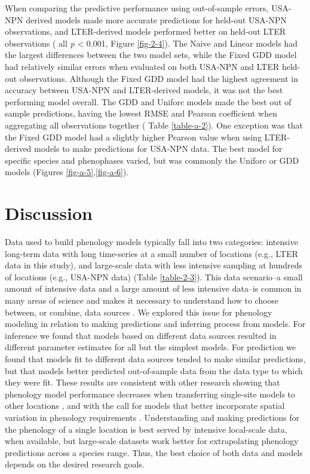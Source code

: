 When comparing the predictive performance using out-of-sample errors, USA-NPN derived models made more accurate predictions for held-out USA-NPN observations, and LTER-derived models performed better on held-out LTER observations ( all \textit{p} < 0.001, Figure \ref{fig-2-4}). The Naive and Linear models had the largest differences between the two model sets, while the Fixed GDD model had relatively similar errors when evaluated on both USA-NPN and LTER held-out observations. Although the Fixed GDD model had the highest agreement in accuracy between USA-NPN and LTER-derived models, it was not the best performing model overall. The GDD and Uniforc models made the best out of sample predictions, having the lowest RMSE and Pearson coefficient when aggregating all observations together ( Table \ref{table-a-2}). One exception was that the Fixed GDD model had a slightly higher Pearson value when using LTER-derived models to make predictions for USA-NPN data. The best model for specific species and phenophases varied, but was commonly the Uniforc or GDD models (Figures \ref{fig-a-5},\ref{fig-a-6}).

\section{Discussion}

Data used to build phenology models typically fall into two categories: intensive long-term data with long time-series at a small number of locations (e.g., LTER data in this study), and large-scale data with less intensive sampling at hundreds of locations (e.g., USA-NPN data) (Table \ref{table-2-3}). This data scenario--a small amount of intensive data and a large amount of less intensive data--is common in many areas of science and makes it necessary to understand how to choose between, or combine, data sources \citep{hanks2018}. We explored this issue for phenology modeling in relation to making predictions and inferring process from models. For inference we found that models based on different data sources resulted in different parameter estimates for all but the simplest models. For prediction we found that models fit to different data sources tended to make similar predictions, but that models better predicted out-of-sample data from the data type to which they were fit. These results are consistent with other research showing that phenology model performance decreases when transferring single-site models to other locations \citep{garcia-mozo2008, xu2013, basler2016}, and with the call for models that better incorporate spatial variation in phenology requirements \citep{richardson2013, chuine2017}. Understanding and making predictions for the phenology of a single location is best served by intensive local-scale data, when available, but large-scale datasets work better for extrapolating phenology predictions across a species range. Thus, the best choice of both data and models depends on the desired research goals.

